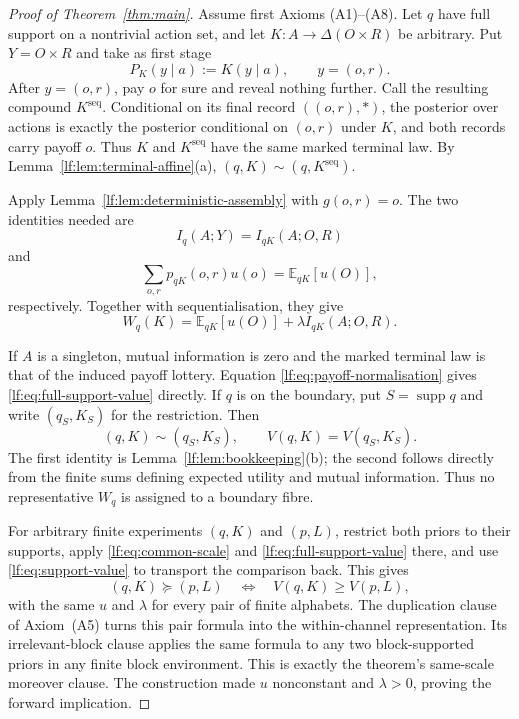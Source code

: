 \documentclass[11pt,a4paper]{article}
\theoremstyle{definition}
\newcommand{\D}{\Delta}
\newcommand{\E}{\mathbb E}
\newcommand{\supp}{\operatorname{supp}}
\newcommand{\1}{\mathbf 1}
\begin{document}
\begin{proof}[Proof of Theorem~\ref{thm:main}]
Assume first Axioms \textup{(A1)--(A8)}.  Let $q$ have full support on a
nontrivial action set, and let $K:A\to\D(O\times R)$ be arbitrary.  Put
$Y=O\times R$ and take as first stage
\[
P_K(y\mid a):=K(y\mid a),
\qquad y=(o,r).
\]
After $y=(o,r)$, pay $o$ for sure and reveal nothing further.  Call the
resulting compound $K^{\mathrm{seq}}$.  Conditional on its final record
$((o,r),\ast)$, the posterior over actions is exactly the posterior conditional
on $(o,r)$ under $K$, and both records carry payoff $o$.  Thus $K$ and
$K^{\mathrm{seq}}$ have the same marked terminal law.  By
Lemma~\ref{lf:lem:terminal-affine}\textup{(a)},
$(q,K)\sim(q,K^{\mathrm{seq}})$.

Apply Lemma~\ref{lf:lem:deterministic-assembly} with $g(o,r)=o$.  The two
identities needed are
\[
I_q(A;Y)=I_{qK}(A;O,R)
\]
and
\[
\sum_{o,r}p_{qK}(o,r)u(o)=\E_{qK}[u(O)],
\]
respectively.  Together with sequentialisation, they give
\begin{equation}
W_q(K)=\E_{qK}[u(O)]+\lambda I_{qK}(A;O,R).
\label{lf:eq:full-support-value}
\end{equation}

If $A$ is a singleton, mutual information is zero and the marked terminal law
is that of the induced payoff lottery.  Equation
\eqref{lf:eq:payoff-normalisation} gives
\eqref{lf:eq:full-support-value} directly.  If $q$ is on the boundary, put
$S=\supp q$ and write $(q_S,K_S)$ for the restriction.  Then
\begin{equation}
(q,K)\sim(q_S,K_S),
\qquad
V(q,K)=V(q_S,K_S).
\label{lf:eq:support-value}
\end{equation}
The first identity is Lemma~\ref{lf:lem:bookkeeping}\textup{(b)}; the second
follows directly from the finite sums defining expected utility and mutual
information.  Thus no representative $W_q$ is assigned to a boundary fibre.

For arbitrary finite experiments $(q,K)$ and $(p,L)$, restrict both priors to
their supports, apply
\eqref{lf:eq:common-scale} and \eqref{lf:eq:full-support-value} there, and use
\eqref{lf:eq:support-value} to transport the comparison back.  This gives
\begin{equation}
(q,K)\succeq(p,L)
\quad\Longleftrightarrow\quad
V(q,K)\ge V(p,L),
\label{lf:eq:pair-value}
\end{equation}
with the same $u$ and $\lambda$ for every pair of finite alphabets.  The
duplication clause of Axiom~\textup{(A5)} turns this pair formula into the
within-channel representation.  Its irrelevant-block clause applies the same
formula to any two block-supported priors in any finite block environment.
This is exactly the theorem's same-scale moreover clause.  The construction
made $u$ nonconstant and $\lambda>0$, proving the forward implication.


\end{proof}
\end{document}

